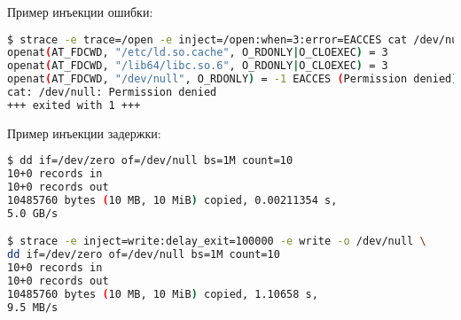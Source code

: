 \documentclass[10pt, a5paper]{article}
\begin{document}
Пример инъекции ошибки:

 
\begin{lstlisting}[language=bash]
$ strace -e trace=/open -e inject=/open:when=3:error=EACCES cat /dev/null 
openat(AT_FDCWD, "/etc/ld.so.cache", O_RDONLY|O_CLOEXEC) = 3 
openat(AT_FDCWD, "/lib64/libc.so.6", O_RDONLY|O_CLOEXEC) = 3 
openat(AT_FDCWD, "/dev/null", O_RDONLY) = -1 EACCES (Permission denied) (INJECTED) 
cat: /dev/null: Permission denied 
+++ exited with 1 +++ 
\end{lstlisting}

Пример инъекции задержки:

\begin{lstlisting}[language=bash]
$ dd if=/dev/zero of=/dev/null bs=1M count=10 
10+0 records in 
10+0 records out 
10485760 bytes (10 MB, 10 MiB) copied, 0.00211354 s, 
5.0 GB/s

$ strace -e inject=write:delay_exit=100000 -e write -o /dev/null \ 
dd if=/dev/zero of=/dev/null bs=1M count=10 
10+0 records in 
10+0 records out 
10485760 bytes (10 MB, 10 MiB) copied, 1.10658 s, 
9.5 MB/s 
\end{lstlisting}
\end{document}
